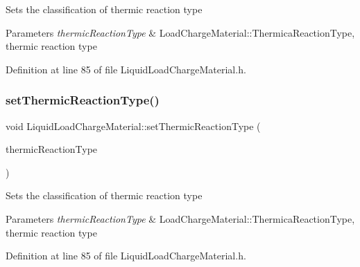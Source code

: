 Sets the classification of thermic reaction type 
\begin{DoxyParams}{Parameters}
{\em thermic\+Reaction\+Type} & Load\+Charge\+Material\+::\+Thermica\+Reaction\+Type, thermic reaction type \\
\hline
\end{DoxyParams}


Definition at line 85 of file Liquid\+Load\+Charge\+Material.\+h.

\mbox{\label{class_liquid_load_charge_material_a39c258d0bfdcfa352590d411a8c4e882}} 
\subsubsection{\texorpdfstring{set\+Thermic\+Reaction\+Type()}{setThermicReactionType()}\hspace{0.1cm}{\footnotesize\ttfamily [2/3]}}
{\footnotesize\ttfamily void Liquid\+Load\+Charge\+Material\+::set\+Thermic\+Reaction\+Type (\begin{DoxyParamCaption}\item[{\hyperlink{namespace_load_charge_material_a51d4263e865a5d86236622dd3fe23fd1}{Load\+Charge\+Material\+::\+Thermic\+Reaction\+Type}}]{thermic\+Reaction\+Type }\end{DoxyParamCaption})\hspace{0.3cm}{\ttfamily [inline]}}

Sets the classification of thermic reaction type 
\begin{DoxyParams}{Parameters}
{\em thermic\+Reaction\+Type} & Load\+Charge\+Material\+::\+Thermica\+Reaction\+Type, thermic reaction type \\
\hline
\end{DoxyParams}


Definition at line 85 of file Liquid\+Load\+Charge\+Material.\+h.

\mbox{\label{class_liquid_load_charge_material_a39c258d0bfdcfa352590d411a8c4e882}} 
